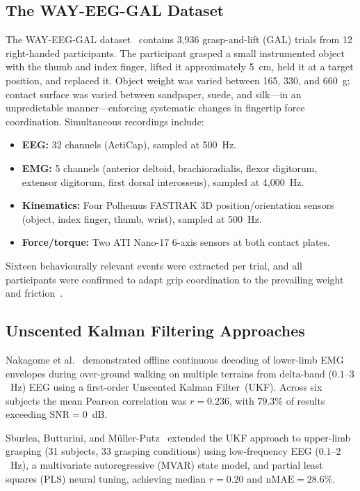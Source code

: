 \documentclass[12pt, a4paper]{article}
\begin{document}
	\subsection{The WAY-EEG-GAL Dataset}
	
	The WAY-EEG-GAL dataset~\cite{luciw2014} contains 3,936 grasp-and-lift (GAL)
	trials from 12 right-handed participants. The participant grasped a small
	instrumented object with the thumb and index finger, lifted it approximately
	5~cm, held it at a target position, and replaced it. Object weight was varied
	between 165, 330, and 660~g; contact surface was varied between sandpaper,
	suede, and silk---in an unpredictable manner---enforcing systematic changes
	in fingertip force coordination. Simultaneous recordings include:
	\begin{itemize}[itemsep=2pt]
		\item \textbf{EEG:} 32 channels (ActiCap), sampled at 500~Hz.
		\item \textbf{EMG:} 5 channels (anterior deltoid, brachioradialis, flexor
		digitorum, extensor digitorum, first dorsal interosseus), sampled at
		4,000~Hz.
		\item \textbf{Kinematics:} Four Polhemus FASTRAK 3D position/orientation
		sensors (object, index finger, thumb, wrist), sampled at 500~Hz.
		\item \textbf{Force/torque:} Two ATI Nano-17 6-axis sensors at both contact
		plates.
	\end{itemize}
	Sixteen behaviourally relevant events were extracted per trial, and all
	participants were confirmed to adapt grip coordination to the prevailing
	weight and friction~\cite{luciw2014}.
	
	\subsection{Unscented Kalman Filtering Approaches}
	
	Nakagome et al.~\cite{nakagome2017} demonstrated offline continuous decoding of
	lower-limb EMG envelopes during over-ground walking on multiple terrains from
	delta-band ($0.1$--$3$~Hz) EEG using a first-order Unscented Kalman
	Filter~(UKF).  Across six subjects the mean Pearson correlation was
	$r = 0.236$, with $79.3\%$ of results exceeding $\mathrm{SNR} = 0$~dB.
	
	Sburlea, Butturini, and M\"{u}ller-Putz~\cite{sburlea2021} extended the UKF
	approach to upper-limb grasping (31 subjects, 33 grasping conditions) using
	low-frequency EEG ($0.1$--$2$~Hz), a multivariate autoregressive (MVAR) state
	model, and partial least squares (PLS) neural tuning, achieving median
	$r = 0.20$ and $\mathrm{nMAE} = 28.6\%$.
	
\end{document}
